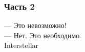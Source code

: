 \documentclass[12pt, a4paper]{article}\usepackage[]{graphicx}\usepackage[]{color}
\begin{document}
\begin{enumerate}
					\begin{figure}
						\begin{tikzpicture}[scale = 0.025]
						
						\end{tikzpicture}
					\end{figure}



				\end{enumerate}


				\subsubsection*{Часть 2}

				\begin{flushright}
					— Это невозможно! \\
					— Нет. Это необходимо.\\
					\textcopyright \hspace{0.1cm} Interstellar
				\end{flushright}
\end{document}
